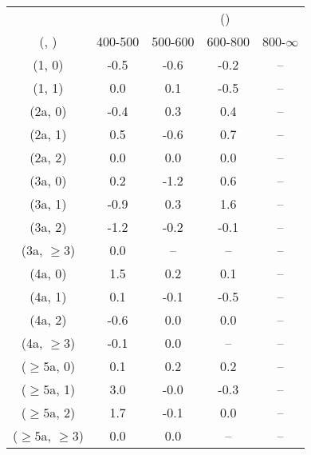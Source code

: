 \begin{table}[h!]
\tiny
\centering
{}
\begin{tabular}
{ccccc}
	\hline\hline
&	& \multicolumn{4}{c}{\scalht (\gev)} \\ 
	 (\njet,  \nb) & 400-500 & 500-600 & 600-800 & 800-$\infty$ \\ [0.8ex] 
\hline
	(1, 0) & -0.5 & -0.6 & -0.2 & -- \\[0.5ex] 
	(1, 1) & 0.0 & 0.1 & -0.5 & -- \\[0.5ex] 
	(2a, 0) & -0.4 & 0.3 & 0.4 & -- \\[0.5ex] 
	(2a, 1) & 0.5 & -0.6 & 0.7 & -- \\[0.5ex] 
	(2a, 2) & 0.0 & 0.0 & 0.0 & -- \\[0.5ex] 
	(3a, 0) & 0.2 & -1.2 & 0.6 & -- \\[0.5ex] 
	(3a, 1) & -0.9 & 0.3 & 1.6 & -- \\[0.5ex] 
	(3a, 2) & -1.2 & -0.2 & -0.1 & -- \\[0.5ex] 
	(3a, $\ge3$) & 0.0 & -- & -- & -- \\[0.5ex] 
	(4a, 0) & 1.5 & 0.2 & 0.1 & -- \\[0.5ex] 
	(4a, 1) & 0.1 & -0.1 & -0.5 & -- \\[0.5ex] 
	(4a, 2) & -0.6 & 0.0 & 0.0 & -- \\[0.5ex] 
	(4a, $\ge3$) & -0.1 & 0.0 & -- & -- \\[0.5ex] 
	($\ge5$a, 0) & 0.1 & 0.2 & 0.2 & -- \\[0.5ex] 
	($\ge5$a, 1) & 3.0 & -0.0 & -0.3 & -- \\[0.5ex] 
	($\ge5$a, 2) & 1.7 & -0.1 & 0.0 & -- \\[0.5ex] 
	($\ge5$a, $\ge3$) & 0.0 & 0.0 & -- & -- \\[0.5ex] 
	\hline
	\hline
\end{tabular}
\end{table}
